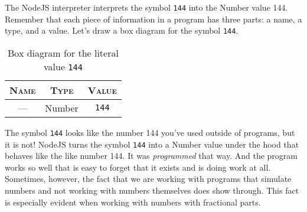The NodeJS interpreter interprets the symbol \texttt{144} into the
\textsf{Number} value 144. Remember that each piece of information in a program
has three parts: a name, a type, and a value. Let's draw a box diagram for the
symbol \texttt{144}.

\begin{table}[h!]
  \begin{tabular}{|c|c|c|}
    \hline
    \textsc{Name} & \textsc{Type} & \textsc{Value}\\
    \hline
    --- & \textsf{Number} & \texttt{144}\\
    \hline
  \end{tabular}
  \caption{Box diagram for the literal value \texttt{144}}
\end{table}

The symbol \texttt{144} looks like the number 144 you've used outside of
programs, but it is not! NodeJS turns the symbol \texttt{144} into a
\textsf{Number} value under the hood that behaves like the like number 144. It
was \emph{programmed} that way. And the program works so well that is easy to
forget that it exists and is doing work at all. Sometimes, however, the fact
that we are working with programs that simulate numbers and not working with
numbers themselves does show through. This fact is especially evident when
working with numbers with fractional parts.


